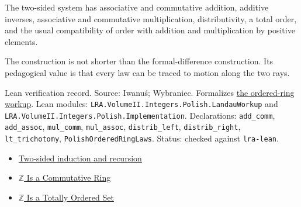 \begin{remark*}
The two-sided system has associative and commutative addition, additive
inverses, associative and commutative multiplication, distributivity, a total
order, and the usual compatibility of order with addition and multiplication
by positive elements.
\end{remark*}

\begin{remark*}[Interpretation]
The construction is not shorter than the formal-difference construction. Its
pedagogical value is that every law can be traced to motion along the two rays.
\end{remark*}

\begin{remark*}[Exposition]
Lean verification record. Source: Iwanu{\'s}; Wybraniec. Formalizes
\hyperref[thm:two-sided-integers-ordered-commutative-ring]{the ordered-ring
workup}. Lean modules:
\texttt{LRA.VolumeII.Integers.Polish.LandauWorkup} and
\texttt{LRA.VolumeII.Integers.Polish.Implementation}. Declarations:
\texttt{add\_comm}, \texttt{add\_assoc}, \texttt{mul\_comm},
\texttt{mul\_assoc}, \texttt{distrib\_left}, \texttt{distrib\_right},
\texttt{lt\_trichotomy}, \texttt{PolishOrderedRingLaws}. Status: checked
against \texttt{lra-lean}.
\end{remark*}

\begin{dependencies}
\begin{itemize}
  \item \hyperref[thm:two-sided-induction-and-recursion]{Two-sided induction and recursion}
  \item \hyperref[thm:z-commutative-ring]{\(\mathbb{Z}\) Is a Commutative Ring}
  \item \hyperref[thm:z-totally-ordered-set]{\(\mathbb{Z}\) Is a Totally Ordered Set}
\end{itemize}
\end{dependencies}

